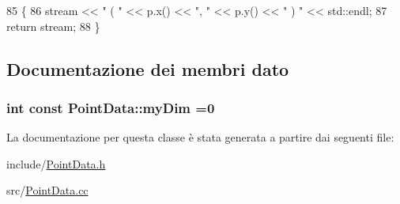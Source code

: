 \begin{DoxyCode}
85 \{
86     stream << \textcolor{stringliteral}{" ( "} << p.x() << \textcolor{stringliteral}{", "} << p.y() << \textcolor{stringliteral}{" ) "} << std::endl;
87     \textcolor{keywordflow}{return} stream;
88 \}\end{DoxyCode}


\subsection{Documentazione dei membri dato}
\hypertarget{classPointData_a71cd9807bc1c94983debb8bbe034916f}{
\subsubsection[{my\-Dim}]{\setlength{\rightskip}{0pt plus 5cm}int const Point\-Data\-::my\-Dim =0\hspace{0.3cm}{\ttfamily [static]}}}\label{classPointData_a71cd9807bc1c94983debb8bbe034916f}


La documentazione per questa classe è stata generata a partire dai seguenti file\-:\begin{DoxyCompactItemize}
\item 
include/\hyperlink{PointData_8h}{Point\-Data.\-h}\item 
src/\hyperlink{PointData_8cc}{Point\-Data.\-cc}\end{DoxyCompactItemize}
